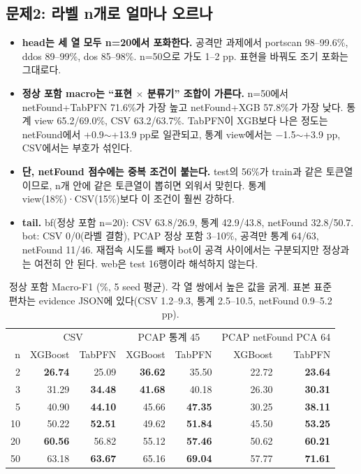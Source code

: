 \subsection{문제2: 라벨 n개로 얼마나 오르나}
\begin{itemize}
\item \textbf{head는 세 열 모두 n=20에서 포화한다.} 공격만 과제에서 portscan 98--99.6\%, ddos 89--99\%, dos 85--98\%. n=50으로 가도 1--2 pp. 표현을 바꿔도 조기 포화는 그대로다.
\item \textbf{정상 포함 macro는 ``표현 $\times$ 분류기'' 조합이 가른다.} n=50에서 netFound+TabPFN 71.6\%가 가장 높고 netFound+XGB 57.8\%가 가장 낮다. 통계 view 65.2/69.0\%, CSV 63.2/63.7\%. TabPFN이 XGB보다 나은 정도는 netFound에서 +0.9$\sim$+13.9 pp로 일관되고, 통계 view에서는 $-$1.5$\sim$+3.9 pp, CSV에서는 부호가 섞인다.
\item \textbf{단, netFound 점수에는 중복 조건이 붙는다.} test의 56\%가 train과 같은 토큰열이므로, n개 안에 같은 토큰열이 뽑히면 외워서 맞힌다. 통계 view(18\%)·CSV(15\%)보다 이 조건이 훨씬 강하다.
\item \textbf{tail.} bf(정상 포함 n=20): CSV 63.8/26.9, 통계 42.9/43.8, netFound 32.8/50.7. bot: CSV 0/0(라벨 결함), PCAP 정상 포함 3--10\%, 공격만 통계 64/63, netFound 11/46. 재접속 시도를 빼자 bot이 공격 사이에서는 구분되지만 정상과는 여전히 안 된다. web은 test 16행이라 해석하지 않는다.
\end{itemize}

\begin{table}[H]
\centering\small
\caption{정상 포함 Macro-F1 (\%, 5 seed 평균). 각 열 쌍에서 높은 값을 굵게. 표본 표준편차는 evidence JSON에 있다(CSV 1.2--9.3, 통계 2.5--10.5, netFound 0.9--5.2 pp).}
\begin{tabular}{r|rr|rr|rr}
\toprule & \multicolumn{2}{c|}{CSV} & \multicolumn{2}{c|}{PCAP 통계 45} & \multicolumn{2}{c}{PCAP netFound PCA 64}\\
n & XGBoost & TabPFN & XGBoost & TabPFN & XGBoost & TabPFN\\\midrule
2  & \textbf{26.74} & 25.09 & \textbf{36.62} & 35.50 & 22.72 & \textbf{23.64}\\
3  & 31.29 & \textbf{34.48} & \textbf{41.68} & 40.18 & 26.30 & \textbf{30.31}\\
5  & 40.90 & \textbf{44.10} & 45.66 & \textbf{47.35} & 30.25 & \textbf{38.11}\\
10 & 50.22 & \textbf{52.51} & 49.62 & \textbf{51.84} & 45.50 & \textbf{53.25}\\
20 & \textbf{60.56} & 56.82 & 55.12 & \textbf{57.46} & 50.62 & \textbf{60.21}\\
50 & 63.18 & \textbf{63.67} & 65.16 & \textbf{69.04} & 57.77 & \textbf{71.61}\\
\bottomrule
\end{tabular}
\end{table}

